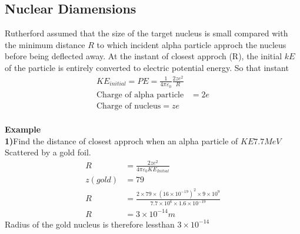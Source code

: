 \subsection{Nuclear Diamensions}
Rutherford assumed that the size of the target nucleus is small compared with the minimum distance $R$ to which incident alpha particle approch the nucleus before being deflected away. At the instant of closest approch (R), the initial $kE$ of the particle is entirely converted to electric potential energy. So that instant\\
\begin{align*}
KE_{initial}=PE=\frac{1}{4\pi\varepsilon_0}\frac{2ze^2}{R}\\
\text{Charge of alpha particle}&=2e\\
\text{Charge of nucleus}=ze\\
\end{align*}
\begin{center}
\end{center}
\textbf{Example}\\
\textbf{1)}\quad Find the distance of closest approch when an alpha particle of $KE7.7 MeV$Scattered by a gold foil.
\begin{align*}
R&=\frac{2ze^2}{4\pi\varepsilon_0KE_{Initial}}\\
z(gold)&=79\\
R&=\frac{2\times79\times(16\times10^{-19})^2\times9\times10^9}{7.7\times10^6\times1.6\times10^{-19}}\\
R&=3\times10^{-14}m
\end{align*}
Radius of the gold nucleus is therefore lessthan $3\times10^{-14}$
